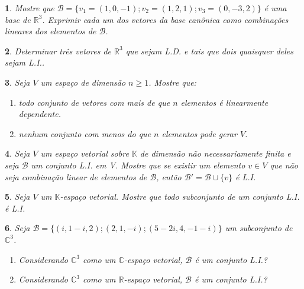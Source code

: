 \documentclass[12pt]{exam}
\newtheorem{exercicio}{}
\newcommand{\real}{\mathbb{R}}
\newcommand{\complex}{\mathbb{C}}
\newcommand{\cp}[1]{\mathbb{#1}}
\begin{document}
\begin{exercicio}
  Mostre que $\mathcal{B} = \{v_1 = (1,0,-1);v_2=(1,2,1);v_3=(0,-3,2)\}$ \'e uma base de $\real^3$. Exprimir cada um dos vetores da base can\^onica como combina\c{c}\~oes lineares dos elementos de $\mathcal{B}$.
\end{exercicio}

\begin{exercicio}
  Determinar tr\^es vetores de $\real^3$ que sejam L.D. e tais que dois quaisquer deles sejam L.I..
\end{exercicio}

\begin{exercicio}
  Seja $V$ um espa\c{c}o de dimens\~ao $n \ge 1$. Mostre que:
  \begin{enumerate}[label={\alph*})]
    \item todo conjunto de vetores com mais de que $n$ elementos \'e linearmente dependente.
    \item nenhum conjunto com menos do que $n$ elementos pode gerar $V$.
  \end{enumerate}
\end{exercicio}

\begin{exercicio}
  Seja $V$ um espa\c{c}o vetorial sobre $\cp{K}$ de dimens\~ao n\~ao necessariamente finita e seja $\mathcal{B}$ um conjunto L.I. em V. Mostre que se existir um elemento $v \in V$ que n\~ao seja combina\c{c}\~ao linear de elementos de $\mathcal{B}$, ent\~ao $\mathcal{B}' = \mathcal{B} \cup \{v\}$ \'e L.I.
\end{exercicio}

\begin{exercicio}
  Seja $V$ um $\cp{K}$-espa\c{c}o vetorial. Mostre que todo subconjunto de um conjunto L.I. \'e L.I.
\end{exercicio}

\begin{exercicio}
  Seja $\mathcal{B} = \{(i, 1-i, 2); (2,1,-i);(5-2i,4,-1-i)\}$ um subconjunto de $\complex^3$.
  \begin{enumerate}[label={\alph*})]
    \item Considerando $\complex^3$ como um $\complex$-espa\c{c}o vetorial, $\mathcal{B}$ \'e um conjunto L.I.?
    \item Considerando $\complex^3$ como um $\real$-espa\c{c}o vetorial, $\mathcal{B}$ \'e um conjunto L.I.?
  \end{enumerate}
\end{exercicio}
\end{document}
